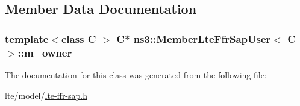 \subsection{Member Data Documentation}
\subsubsection[{\texorpdfstring{m\+\_\+owner}{m_owner}}]{\setlength{\rightskip}{0pt plus 5cm}template$<$class C $>$ {\bf C}$\ast$ {\bf ns3\+::\+Member\+Lte\+Ffr\+Sap\+User}$<$ {\bf C} $>$\+::m\+\_\+owner\hspace{0.3cm}{\ttfamily [private]}}\hypertarget{classns3_1_1MemberLteFfrSapUser_ab45f512f2011a02858715339eb57070f}{}\label{classns3_1_1MemberLteFfrSapUser_ab45f512f2011a02858715339eb57070f}


The documentation for this class was generated from the following file\+:\begin{DoxyCompactItemize}
\item 
lte/model/\hyperlink{lte-ffr-sap_8h}{lte-\/ffr-\/sap.\+h}\end{DoxyCompactItemize}
